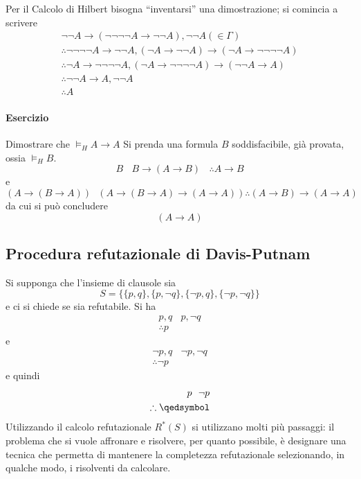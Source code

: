 Per il Calcolo di Hilbert bisogna ``inventarsi'' una dimostrazione; si 
comincia a scrivere 
\begin{align*}
\neg \neg A \rightarrow (\neg \neg \neg \neg A \rightarrow \neg \neg A), \neg \neg A ( \in \Gamma)\\
\therefore \neg \neg \neg \neg A \rightarrow \neg \neg A, (  \neg A \rightarrow \neg \neg A) \rightarrow (\neg A \rightarrow \neg \neg \neg \neg A)\\
\therefore \neg A \rightarrow \neg \neg \neg \neg A, (\neg A \rightarrow \neg \neg \neg \neg A) \rightarrow ( \neg \neg A \rightarrow A) \\
\therefore  \neg \neg A \rightarrow A, \neg \neg A \\
\therefore A
\end{align*}

\paragraph{Esercizio}
Dimostrare che $\models_H A \rightarrow A$
Si prenda una formula $B$ soddisfacibile, già provata, ossia $\models_H B$. 
$$
B ~~~~ B \rightarrow (A \rightarrow B) ~~~~ \therefore A \rightarrow B
$$
e 
$$
(A \rightarrow (B \rightarrow A)) ~~~ (A \rightarrow (B \rightarrow A) \rightarrow (A \rightarrow A)) 
\therefore (A\rightarrow B) \rightarrow (A \rightarrow A)
$$
da cui si può concludere 
$$
(A \rightarrow A)
$$
\subsection{Procedura refutazionale di Davis-Putnam}
Si supponga che l'insieme di clausole sia 
$$
S = \{\{p,q\}, \{p, \neg q\}, \{\neg p, q\}, \{\neg p, \neg q\}\} 
$$
e ci si chiede se sia refutabile.
Si ha 
\begin{align*}
        p,q ~~~~ p, \neg q \\
        \therefore p 
\end{align*}
e 
\begin{align*}
        \neg p, q  ~~~~ \neg p, \neg q \\
        \therefore \neg p
\end{align*}
e quindi 
\begin{align*}
        p ~~ \neg p \\
        \therefore \qedsymbol
\end{align*}
Utilizzando il calcolo refutazionale $R^*(S)$ si utilizzano molti più passaggi: 
il problema che si vuole affronare e risolvere, per quanto possibile, è 
designare una tecnica che permetta di mantenere la completezza 
refutazionale selezionando, in qualche modo, i risolventi da calcolare. 


